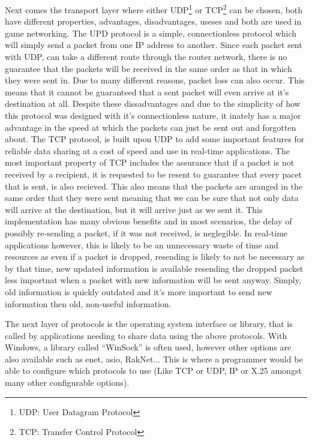 Next comes the transport layer where either UDP\footnote{UDP: User Datagram Protocol} or TCP\footnote{TCP: Transfer Control Protocol}  can be chosen, both have different properties, advantages, disadvantages, useses and both are used in game networking. The UPD protocol is a simple, connectionless protocol which will simply send a packet from one IP address to another. Since each packet sent with UDP, can take a different route through the router network, there is no guarantee that the packets will be received in the same order as that in which they were sent in. Due to many different reasons, packet loss can also occur. This means that it cannot be guaranteed that a sent packet will even arrive at it's destination at all. Despite these dissadvantages and due to the simplicity of how this protocol was designed with it's connectionless nature, it inately has a major advantage in the speed at which the packets can just be sent out and forgotten about. The TCP protocol, is built upon UDP to add some important features for reliable data sharing at a cost of speed and use in real-time applications. The most important property of TCP includes the assurance that if a packet is not received by a recipient, it is requested to be resent to guarantee that every pacet that is sent, is also recieved. This also means that the packets are aranged in the same order that they were sent meaning that we can be sure that not only data will arrive at the destination, but it will arrive just as we sent it. This implementation has many obvious benefits and in most scenarios, the delay of possibly re-sending a packet, if it was not received, is neglegible. In real-time applications however, this is likely to be an unnecessary waste of time and resources as even if a packet is dropped, resending is likely to not be necessary as by that time, new updated information is available resending the dropped packet less importnat  when a packet with new information will be sent anyway. Simply, old information is quickly outdated and it's more important to send new information then old, non-useful information.

The next layer of protocols is the operating system interface or library, that is called by applications needing to share data using the above protocols. With Windows, a library called ``WinSock'' is often used, however other options are also available such as enet, asio, RakNet... This is where a programmer would be able to configure which protocols to use (Like TCP or UDP, IP or X.25 amongst many other configurable options).


